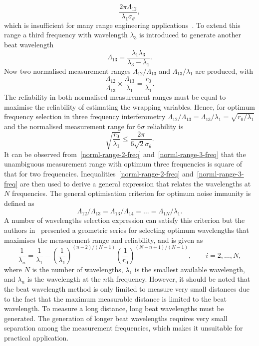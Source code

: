 \[
\frac{2\pi \Lambda_{12}}{\lambda_1\sigma_{\theta}},
\]
which is insufficient for many range engineering applications~\cite{Towers_frequency_selection_interferometry_2003}. To extend this range a third frequency with wavelength $\lambda_3$ is introduced to generate another beat wavelength
\[
\Lambda_{13} = \frac{\lambda_1\lambda_3}{\lambda_3 - \lambda_1}.
\]
Now two normalised measurement ranges $\Lambda_{12}/\Lambda_{13}$ and $\Lambda_{13}/\lambda_1$ are produced, with
\[
\frac{\Lambda_{12}}{\Lambda_{13}} \times \frac{\Lambda_{13}}{\lambda_1} = \frac{r_0}{\lambda_1}.
\]
The reliability in both normalised measurement ranges must be equal to maximise the reliability of estimating the wrapping variables. Hence, for optimum frequency selection in three frequency interferometry $\Lambda_{12}/\Lambda_{13} = \Lambda_{13}/\lambda_1 = \sqrt{r_0/\lambda_1}$ and the normalised measurement range for $6\sigma$ reliability is
\begin{equation}\label{norml-range-3-freq}
\sqrt{\frac{r_0}{\lambda_1}} \leq \frac{2\pi}{6\sqrt{2}\sigma_{\theta}}.
\end{equation}
It can be observed from~\ref{norml-range-2-freq} and~\ref{norml-range-3-freq} that the unambiguous measurement range with optimum three frequencies is square of that for two frequencies. Inequalities~\ref{norml-range-2-freq} and~\ref{norml-range-3-freq} are then used to derive a general expression that relates the wavelengths at $N$ frequencies. The general optimisation  criterion for optimum noise immunity is defined as
\begin{equation}\label{general-optim-criterion}
\Lambda_{12}/\Lambda_{13} = \Lambda_{13}/\Lambda_{14} = \dots = \Lambda_{1N}/\lambda_{1}.
\end{equation}
A number of wavelengths selection expression can satisfy this criterion but the authors in~\cite{Towers_frequency_selection_interferometry_2003} presented a geometric series for selecting optimum wavelengths that maximises the measurement range and reliability, and is given as
\begin{equation}
\frac{1}{\lambda_n} = \frac{1}{\lambda_1} - \left( \frac{1}{\lambda_1} \right)^{(n-2)/(N-1)}\left(\frac{1}{r_0} \right)^{(N-n+1)/(N-1)}, \qquad i=2, \ldots, N,
\end{equation}
where $N$ is the number of wavelengths, $\lambda_1$ is the smallest available wavelength, and $\lambda_n$ is the wavelength at the $n$th frequency. However, it should be noted that the beat wavelength method is only limited to measure very small distances due to the fact that the maximum measurable distance is limited to the beat wavelength. To measure a long distance, long beat wavelengths must be generated. The generation of longer beat wavelengths requires very small separation among the measurement frequencies, which makes it unsuitable for practical application. 

